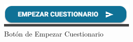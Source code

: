 \begin{itemize}
\begin{figure}[hbtp]
			\includegraphics[scale=0.6]{images/Interfaz/IUGS01_botoncuestionario.png}
			\caption{Botón de Empezar Cuestionario}
		\end{figure}
		
	\end{itemize}
	
	